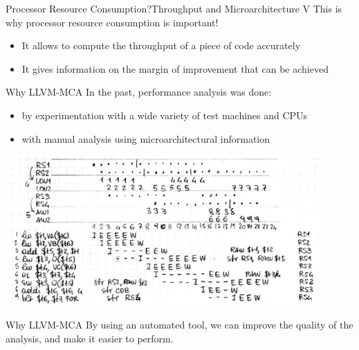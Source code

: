 \begin{frame}{Processor Resource Consumption?}{Throughput and Microarchitecture V}
This is why \alert{processor resource consumption} is important!
\bigskip
\begin{itemize}
\item It allows to compute the throughput of a piece of code accurately
\item It gives information on the \alert{margin of improvement} that can be achieved
\end{itemize}
\end{frame}


\begin{frame}{Why LLVM-MCA}
In the past, performance analysis was done:
\begin{itemize}
\item by \alert{experimentation} with a wide variety of test machines and CPUs
\item with \alert{manual analysis} using microarchitectural information
\end{itemize}

\begin{centering}
\includegraphics[width=0.9\textwidth]{img/manual-perf-analysis.jpg}\\
\end{centering}
\end{frame}


\begin{frame}{Why LLVM-MCA}
By using an automated tool, we can \alert{improve} the quality of the analysis,
and make it easier to perform.\\
\medskip
\begin{columns}

\end{columns}
\end{frame}











